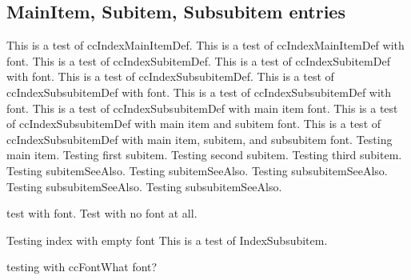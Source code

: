 \documentclass{article}
\begin{document}
{{{{%
\subsection{MainItem, Subitem, Subsubitem entries}

\pagebreak
This is a test of ccIndexMainItemDef.
This is a test of ccIndexMainItemDef with font.
This is a test of ccIndexSubitemDef.
This is a test of ccIndexSubitemDef with font.
This is a test of ccIndexSubsubitemDef.
This is a test of ccIndexSubsubitemDef with font.
This is a test of ccIndexSubsubitemDef with font.
This is a test of ccIndexSubsubitemDef with main item font.
This is a test of ccIndexSubsubitemDef with main item and subitem font.
This is a test of ccIndexSubsubitemDef with main item, subitem, and subsubitem font.
\pagebreak
Testing main item.
Testing first subitem.
Testing second subitem.
Testing third subitem.
Testing subitemSeeAlso.
Testing subitemSeeAlso.
Testing subsubitemSeeAlso.
Testing subsubitemSeeAlso.
Testing subsubitemSeeAlso.

test with font.
Test with no font at all.

Testing index with empty font
This is a test of IndexSubsubitem.

testing with ccFontWhat font?

}}}}
\end{document}
